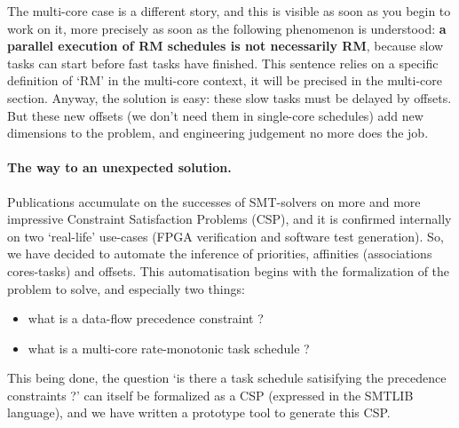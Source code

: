 \documentclass[a4paper]{article}
\begin{document}
The multi-core case is a different story, and this is visible as soon as you begin to work on it, more precisely as soon as the following phenomenon is understood:
\textbf{a parallel execution of RM schedules is not necessarily RM},
because slow tasks can start before fast tasks have finished.
This sentence relies on a specific definition of `RM' in the multi-core context, it will be precised in the multi-core section.
Anyway, the solution is easy: these slow tasks must be delayed by offsets.
But these new offsets (we don't need them in single-core schedules) add new dimensions to the problem,
and engineering judgement no more does the job.

\paragraph*{The way to an unexpected solution.}

Publications accumulate on the successes of SMT-solvers on more and more impressive Constraint Satisfaction Problems (CSP),
and it is confirmed internally on two `real-life' use-cases (FPGA verification and software test generation).
So, we have decided to automate the inference of priorities, affinities (associations cores-tasks) and offsets.
This automatisation begins with the formalization of the problem to solve, and especially two things:
\begin{itemize}
\item what is a data-flow precedence constraint ?
\item what is a multi-core rate-monotonic task schedule ?
\end{itemize}
This being done, the question `is there a task schedule satisifying the precedence constraints ?' can itself be formalized as a CSP (expressed in the SMTLIB language),
and we have written a prototype tool to generate this CSP.
\end{document}

